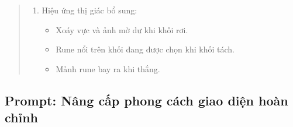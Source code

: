 \begin{quote}
\begin{enumerate}
  \item Hiệu ứng thị giác bổ sung:
  \begin{itemize}
    \item Xoáy vực và ảnh mờ dư khi khối rơi.
    \item Rune nổi trên khối đang được chọn khi khối tách.
    \item Mảnh rune bay ra khi thắng.
  \end{itemize}
\end{enumerate}
\end{quote}

\subsection*{Prompt: Nâng cấp phong cách giao diện hoàn chỉnh}
\label{sec:prompt-obsidian}

